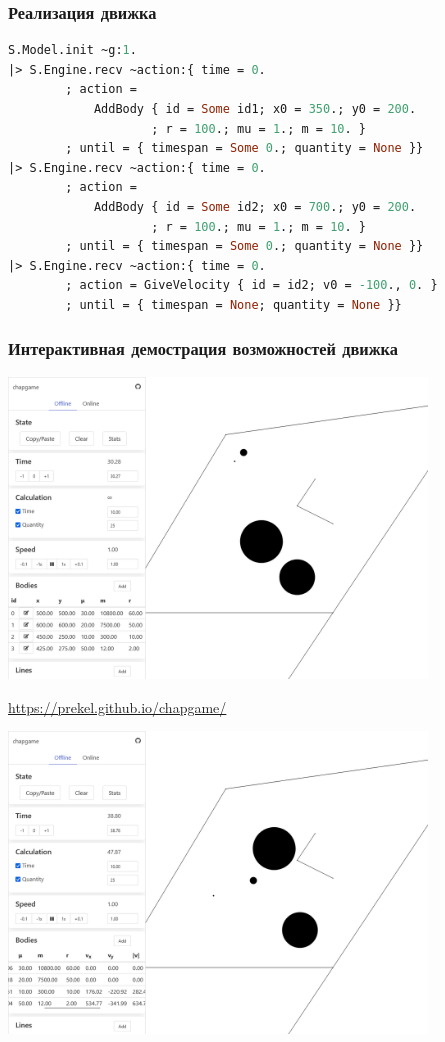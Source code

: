 \documentclass[xetex,aspectratio=43]{beamer}
\begin{document}
\begin{frame}[fragile]
    \frametitle{Реализация движка}

    \footnotesize
    \begin{lstlisting}[language=ml]
S.Model.init ~g:1.
|> S.Engine.recv ~action:{ time = 0.
        ; action =
            AddBody { id = Some id1; x0 = 350.; y0 = 200.
                    ; r = 100.; mu = 1.; m = 10. }
        ; until = { timespan = Some 0.; quantity = None }}
|> S.Engine.recv ~action:{ time = 0.
        ; action =
            AddBody { id = Some id2; x0 = 700.; y0 = 200.
                    ; r = 100.; mu = 1.; m = 10. }
        ; until = { timespan = Some 0.; quantity = None }}
|> S.Engine.recv ~action:{ time = 0.
        ; action = GiveVelocity { id = id2; v0 = -100., 0. }
        ; until = { timespan = None; quantity = None }}
    \end{lstlisting}

\end{frame}

\begin{frame}
    \frametitle{Интерактивная демострация возможностей движка}

    \includegraphics[height=8cm]{chapgame_1}

\end{frame}

\begin{frame}
    {\color{blue}\url{https://prekel.github.io/chapgame/}}

    \includegraphics[height=8cm]{chapgame_2}

\end{frame}
\end{document}
